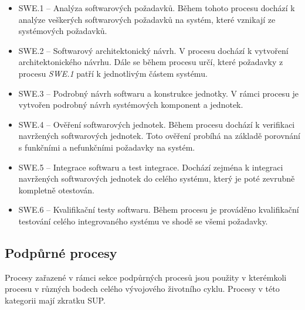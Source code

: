 \documentclass[czech,master]{diploma}
\begin{document}
\begin{itemize}
\item SWE.1 -- Analýza softwarových požadavků. Během tohoto procesu dochází k analýze veškerých softwarových požadavků na systém, které vznikají ze systémových požadavků.
\item SWE.2 -- Softwarový architektonický návrh. V procesu dochází k vytvoření architektonického návrhu. Dále se během procesu určí, které požadavky z procesu \textit{SWE.1} patří k jednotlivým částem systému.
\item SWE.3 -- Podrobný návrh softwaru a konstrukce jednotky. V rámci procesu je vytvořen podrobný návrh systémových komponent a jednotek.
\item SWE.4 -- Ověření softwarových jednotek. Během procesu dochází k verifikaci navržených softwarových jednotek. Toto ověření probíhá na základě porovnání s funkčními a nefunkčními požadavky na systém.
\item SWE.5 -- Integrace softwaru a test integrace. Dochází zejména k integraci navržených softwarových jednotek do celého systému, který je poté zevrubně kompletně otestován.
\item SWE.6 -- Kvalifikační testy softwaru. Během procesu je prováděno kvalifikační testování celého integrovaného systému ve shodě se všemi požadavky.
\end{itemize}

\subsection{Podpůrné procesy}
Procesy zařazené v rámci sekce podpůrných procesů jsou použity v kterémkoli procesu v různých bodech celého vývojového životního cyklu. Procesy v této kategorii mají zkratku SUP.
\end{document}
